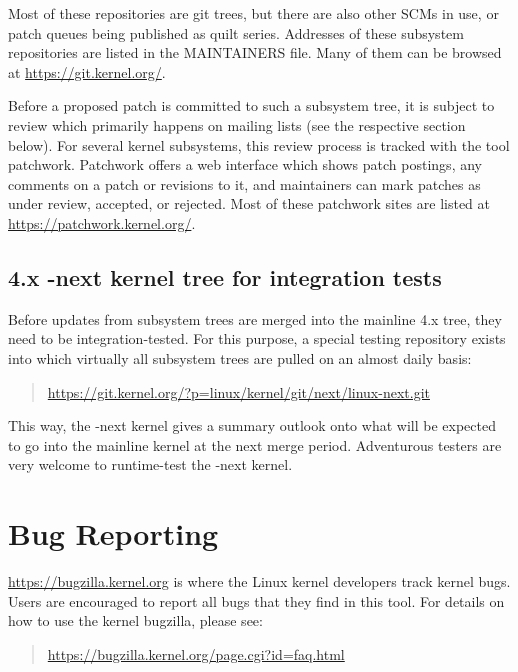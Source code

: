 \documentclass[a4paper,8pt,english]{sphinxmanual}
\begin{document}
Most of these repositories are git trees, but there are also other SCMs
in use, or patch queues being published as quilt series.  Addresses of
these subsystem repositories are listed in the MAINTAINERS file.  Many
of them can be browsed at \href{https://git.kernel.org/}{https://git.kernel.org/}.

Before a proposed patch is committed to such a subsystem tree, it is
subject to review which primarily happens on mailing lists (see the
respective section below).  For several kernel subsystems, this review
process is tracked with the tool patchwork.  Patchwork offers a web
interface which shows patch postings, any comments on a patch or
revisions to it, and maintainers can mark patches as under review,
accepted, or rejected.  Most of these patchwork sites are listed at
\href{https://patchwork.kernel.org/}{https://patchwork.kernel.org/}.


\subsection{4.x -next kernel tree for integration tests}
\label{process/howto:x-next-kernel-tree-for-integration-tests}
Before updates from subsystem trees are merged into the mainline 4.x
tree, they need to be integration-tested.  For this purpose, a special
testing repository exists into which virtually all subsystem trees are
pulled on an almost daily basis:
\begin{quote}

\href{https://git.kernel.org/?p=linux/kernel/git/next/linux-next.git}{https://git.kernel.org/?p=linux/kernel/git/next/linux-next.git}
\end{quote}

This way, the -next kernel gives a summary outlook onto what will be
expected to go into the mainline kernel at the next merge period.
Adventurous testers are very welcome to runtime-test the -next kernel.


\section{Bug Reporting}
\label{process/howto:bug-reporting}
\href{https://bugzilla.kernel.org}{https://bugzilla.kernel.org} is where the Linux kernel developers track kernel
bugs.  Users are encouraged to report all bugs that they find in this
tool.  For details on how to use the kernel bugzilla, please see:
\begin{quote}

\href{https://bugzilla.kernel.org/page.cgi?id=faq.html}{https://bugzilla.kernel.org/page.cgi?id=faq.html}
\end{quote}
\end{document}
